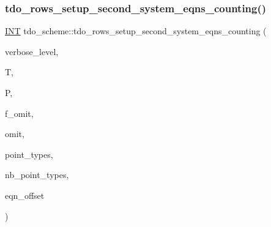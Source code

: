 \subsubsection{\texorpdfstring{tdo\+\_\+rows\+\_\+setup\+\_\+second\+\_\+system\+\_\+eqns\+\_\+counting()}{tdo\_rows\_setup\_second\_system\_eqns\_counting()}}
{\footnotesize\ttfamily \mbox{\hyperlink{galois_8h_a09fddde158a3a20bd2dcadb609de11dc}{I\+NT}} tdo\+\_\+scheme\+::tdo\+\_\+rows\+\_\+setup\+\_\+second\+\_\+system\+\_\+eqns\+\_\+counting (\begin{DoxyParamCaption}\item[{\mbox{\hyperlink{galois_8h_a09fddde158a3a20bd2dcadb609de11dc}{I\+NT}}}]{verbose\+\_\+level,  }\item[{\mbox{\hyperlink{classtdo__data}{tdo\+\_\+data}} \&}]{T,  }\item[{\mbox{\hyperlink{classpartitionstack}{partitionstack}} \&}]{P,  }\item[{\mbox{\hyperlink{galois_8h_a09fddde158a3a20bd2dcadb609de11dc}{I\+NT}}}]{f\+\_\+omit,  }\item[{\mbox{\hyperlink{galois_8h_a09fddde158a3a20bd2dcadb609de11dc}{I\+NT}}}]{omit,  }\item[{\mbox{\hyperlink{galois_8h_a09fddde158a3a20bd2dcadb609de11dc}{I\+NT}} $\ast$}]{point\+\_\+types,  }\item[{\mbox{\hyperlink{galois_8h_a09fddde158a3a20bd2dcadb609de11dc}{I\+NT}}}]{nb\+\_\+point\+\_\+types,  }\item[{\mbox{\hyperlink{galois_8h_a09fddde158a3a20bd2dcadb609de11dc}{I\+NT}}}]{eqn\+\_\+offset }\end{DoxyParamCaption})}

\mbox{\label{classtdo__scheme_a5471aa8f875a23a6d9d70f5d72618e95}} 
